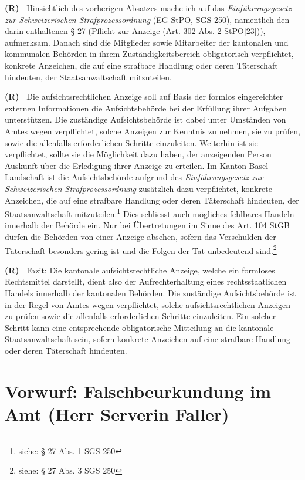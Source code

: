 \documentclass[paper=a4,fontsize=12pt, oneside, numbers=noenddot]{scrbook}
\newcounter{rz}
\newcommand{\Rz}{
	\addtocounter{rz}{1}\textbf{(R\arabic{rz})~}
}
\begin{document}
\Rz Hinsichtlich des vorherigen Absatzes mache ich auf das  \textit{Einführungsgesetz zur Schweizerischen Strafprozessordnung} (EG StPO, SGS 250), namentlich den darin enthaltenen § 27 (Pflicht zur Anzeige (Art. 302 Abs. 2 StPO[23])), aufmerksam. Danach sind  die Mitglieder sowie Mitarbeiter der kantonalen und kommunalen Behörden in ihrem Zuständigkeitsbereich obligatorisch verpflichtet, konkrete Anzeichen, die auf eine strafbare Handlung oder deren Täterschaft hindeuten, der Staatsanwaltschaft mitzuteilen.  

\Rz Die aufsichtsrechtlichen Anzeige soll auf Basis der formlos eingereichter externen Informationen die Aufsichtsbehörde bei der Erfüllung ihrer Aufgaben unterstützen. Die zuständige Aufsichtsbehörde ist dabei unter Umständen von Amtes wegen verpflichtet, solche Anzeigen zur Kenntnis zu nehmen, sie zu prüfen, sowie die allenfalls erforderlichen Schritte einzuleiten. Weiterhin ist sie verpflichtet, sollte sie die Möglichkeit dazu haben, der anzeigenden Person Auskunft über die Erledigung ihrer Anzeige zu erteilen. Im Kanton Basel-Landschaft ist die Aufsichtsbehörde aufgrund des \textit{Einführungsgesetz zur Schweizerischen Strafprozessordnung} zusätzlich dazu verpflichtet, konkrete Anzeichen, die auf eine strafbare Handlung oder deren Täterschaft hindeuten, der Staatsanwaltschaft mitzuteilen.\footnote{siehe: § 27 Abs. 1 SGS 250} Dies schliesst auch mögliches fehlbares Handeln innerhalb der Behörde ein. Nur bei Übertretungen im Sinne des Art. 104 StGB  dürfen die Behörden von einer Anzeige absehen, sofern das Verschulden der Täterschaft besonders gering ist und die Folgen der Tat unbedeutend sind.\footnote{siehe: § 27 Abs. 3 SGS 250}

\Rz Fazit: Die kantonale aufsichtsrechtliche Anzeige, welche ein formloses Rechtsmittel darstellt, dient also der Aufrechterhaltung eines rechtsstaatlichen Handels innerhalb der kantonalen Behörden.  Die zuständige Aufsichtsbehörde ist in der Regel von Amtes wegen verpflichtet, solche aufsichtsrechtlichen Anzeigen zu prüfen sowie die allenfalls erforderlichen Schritte einzuleiten. Ein solcher Schritt kann eine entsprechende obligatorische Mitteilung an die kantonale Staatsanwaltschaft sein, sofern konkrete Anzeichen auf eine strafbare Handlung oder deren Täterschaft hindeuten.




\chapter{Vorwurf: Falschbeurkundung im Amt (Herr Serverin Faller)}
\end{document}
